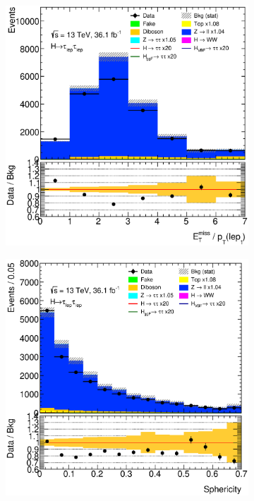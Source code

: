 \begin{figure}[htb]
\begin{subfigure}[t]{0.3\textwidth}
    \end{subfigure}
    \begin{subfigure}[t]{0.3\textwidth}
        \includegraphics[width=\textwidth]{./plots/mva/modeling/input_vars/BOOST_CR/ll-CutMVABoostedCatZllCR-RatioMETPtL1-lin.eps}
    \end{subfigure}
    \begin{subfigure}[t]{0.3\textwidth}
        \includegraphics[width=\textwidth]{./plots/mva/modeling/input_vars/BOOST_CR/ll-CutMVABoostedCatZllCR-Sphericity-lin.eps}

\end{subfigure}
\end{figure}
